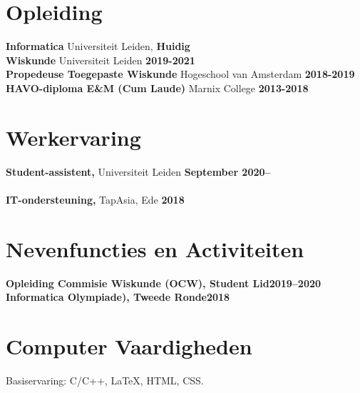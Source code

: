 \documentclass[margin,line]{res}
\begin{document}
\newcommand{\myname}{Tim Greven}
\newlength{\mynamewidth}
\settowidth{\mynamewidth}{\namefont\myname}

\name{\hspace*{0.5\textwidth}\hspace{-0.5\mynamewidth} \myname \vspace*{.1in}}
\thispagestyle{empty}






\section{\sc Opleiding}
{\bf Informatica} Universiteit Leiden, \hfill {\bf Huidig}\\

{\bf Wiskunde} Universiteit Leiden \hfill {\bf 2019-2021}\\
{\bf Propedeuse Toegepaste Wiskunde} Hogeschool van Amsterdam \hfill {\bf 2018-2019}\\
{\bf HAVO-diploma E\&M (Cum Laude)} Marnix College \hfill {\bf 2013-2018}\\


\section{\sc Werkervaring}
{\bf Student-assistent,} Universiteit Leiden \hfill {\bf September 2020--}\\
\\
{\bf IT-ondersteuning,} TapAsia, Ede \hfill {\bf  2018}\\

\vspace{-1em}


\vspace{-1em}


\section{\sc Nevenfuncties en Activiteiten}
{\bf Opleiding Commisie Wiskunde (OCW), Student Lid}\hfill{\bf 2019--2020}
\\
{\bf Informatica Olympiade), Tweede Ronde}\hfill{\bf 2018}



\section{\sc Computer Vaardigheden}
Basiservaring: C/C++, \LaTeX, HTML, CSS.
\end{document}
